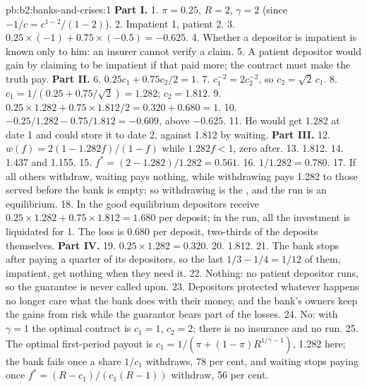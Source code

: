 \begin{solution}{pb:b2:banks-and-crises:1}
\textbf{Part I.}
1. $\pi = 0.25$, $R = 2$, $\gamma = 2$ (since $-1/c = c^{1-2}/(1 - 2)$).
2. Impatient 1, patient 2.
3. $0.25 \times (-1) + 0.75 \times (-0.5) = -0.625$.
4. Whether a depositor is impatient is known only to him: an insurer cannot verify a claim.
5. A patient depositor would gain by claiming to be impatient if that paid more; the contract must make the truth pay.
\textbf{Part II.}
6. $0.25c_1 + 0.75c_2/2 = 1$.
7. $c_1^{-2} = 2c_2^{-2}$, so $c_2 = \sqrt2\,c_1$.
8. $c_1 = 1/(0.25 + 0.75/\sqrt2) = 1.282$; $c_2 = 1.812$.
9. $0.25 \times 1.282 + 0.75 \times 1.812/2 = 0.320 + 0.680 = 1$.
10. $-0.25/1.282 - 0.75/1.812 = -0.609$, above $-0.625$.
11. He would get 1.282 at date 1 and could store it to date 2, against 1.812 by waiting.
\textbf{Part III.}
12. $w(f) = 2(1 - 1.282f)/(1 - f)$ while $1.282f < 1$, zero after.
13. 1.812.
14. 1.437 and 1.155.
15. $f^* = (2 - 1.282)/1.282 = 0.561$.
16. $1/1.282 = 0.780$.
17. If all others withdraw, waiting pays nothing, while withdrawing pays 1.282 to those served before the bank is empty: so
withdrawing is the , and the run is an equilibrium.
18. In the good equilibrium depositors receive $0.25 \times 1.282 + 0.75 \times 1.812 = 1.680$ per deposit; in the run, all
the investment is liquidated for 1. The loss is 0.680 per deposit, two-thirds of the deposits themselves.
\textbf{Part IV.}
19. $0.25 \times 1.282 = 0.320$.
20. 1.812.
21. The bank stops after paying a quarter of its depositors, so the last $1/3 - 1/4 = 1/12$ of them, impatient, get
nothing when they need it.
22. Nothing: no patient depositor runs, so the guarantee is never called upon.
23. Depositors protected whatever happens no longer care what the bank does with their money, and the bank's owners keep
the gains from risk while the guarantor bears part of the losses.
24. No: with $\gamma = 1$ the optimal contract is $c_1 = 1$, $c_2 = 2$; there is no insurance and no run.
25. The optimal first-period payout is $c_1 = 1/(\pi + (1 - \pi)R^{1/\gamma - 1})$, 1.282 here; the bank fails once a
share $1/c_1$ withdraws, 78 per cent, and waiting stops paying once $f^* = (R - c_1)/(c_1(R - 1))$ withdraw, 56 per cent.
\end{solution}

